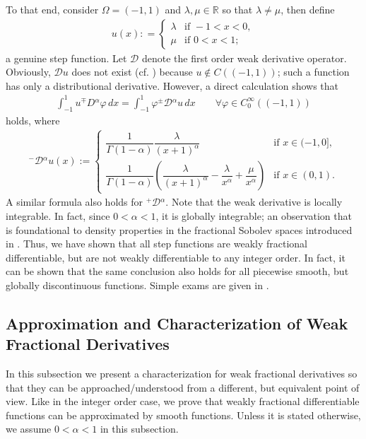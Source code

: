 \documentclass[leqno,final]{siamltex}
\numberwithin{equation}{section}
\renewcommand{\(}{\bigl(}
\renewcommand{\)}{\bigr)}
\newcommand{\R}{\mathbb{R}}
\begin{document}
    To that end, consider $\Omega = (-1,1)$ and $\lambda , \mu \in \R$ so that $\lambda \neq \mu$, 
    then define
    \begin{align*}
        u(x) : = \begin{cases}
            \lambda &\text{if } -1<x <0, \\ 
            \mu &\text{if } 0<x <1;
        \end{cases}
    \end{align*}
    a genuine step function. Let $\mathcal{D}$ denote the first order weak derivative operator. 
    Obviously, $\mathcal{D}u$ does not exist (cf. \cite{Brezis}) because $u \not\in C((-1,1))$; such a function has only a distributional derivative. 
    However,  a direct calculation shows that  
    \begin{align*}
        \int_{-1}^{1} u  {^{\mp}}{D}{^{\alpha}} \varphi \,dx = \int_{-1}^{1}  \varphi {^{\pm}}{ \mathcal{D}}{^{\alpha}}u \,dx \qquad \forall \varphi\in C^\infty_0((-1,1))
    \end{align*}
    holds, where 
    \begin{align*}
        {^{-}}{ \mathcal{D} }{^{\alpha}} u(x) := \begin{cases}
         \dfrac{1}{\Gamma(1-\alpha)} \dfrac{\lambda}{(x+1)^{\alpha}}&\text{if } x \in (-1,0], \\ 
         \dfrac{1}{\Gamma(1-\alpha)} \left( \dfrac{\lambda}{(x+1)^{\alpha}} - \dfrac{\lambda}{x^{\alpha}} + \dfrac{\mu}{x^{\alpha}} \right) &\text{if } x \in (0,1).
        \end{cases} 
    \end{align*}
    A similar formula also holds for ${^{+}}{ \mathcal{D} }{^{\alpha}}$. Note that the weak derivative is locally integrable. In fact, since $0 < \alpha <1$, it is globally integrable; an observation that is foundational to density properties  in the fractional Sobolev spaces introduced in \cite{Feng_Sutton1a}.
    Thus, we have shown that all step functions are weakly fractional differentiable, but are not weakly differentiable to any integer order. In fact, it can be shown that the same conclusion also holds for all piecewise smooth, but globally discontinuous functions. Simple exams are given in \cite{Brezis, Evans}.
    
    \subsection{Approximation and Characterization of Weak Fractional Derivatives}\label{sec-4.3}
    In this subsection we present a characterization for weak fractional derivatives so that they can be approached/understood from a different, but equivalent point of view. Like in the integer order case, 
    we prove that weakly fractional differentiable functions can be approximated by 
    smooth functions.  Unless it is stated otherwise, we assume $0<\alpha< 1$ in this subsection. 
    
\end{document}

